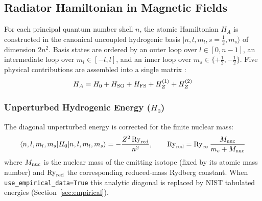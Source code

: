\documentclass[11pt,a4paper]{article}
\numberwithin{equation}{section}
\begin{document}
\subsection{Radiator Hamiltonian in Magnetic Fields}
\label{sec:radiator_H}
For each principal quantum number shell $n$, the atomic Hamiltonian $H_A$ is constructed in the canonical uncoupled hydrogenic basis $|n, l, m_l, s{=}\tfrac{1}{2}, m_s\rangle$ of dimension $2n^2$. Basis states are ordered by an outer loop over $l \in [0, n-1]$, an intermediate loop over $m_l \in [-l, l]$, and an inner loop over $m_s \in \{+\tfrac{1}{2}, -\tfrac{1}{2}\}$. Five physical contributions are assembled into a single matrix \cite{bethesalpeter}:
\begin{equation}
H_A = H_0 + H_{\rm SO} + H_{\rm FS} + H_Z^{(1)} + H_Z^{(2)}
\end{equation}

\subsubsection{\texorpdfstring{Unperturbed Hydrogenic Energy ($H_0$)}{Unperturbed Hydrogenic Energy (H0)}}
The diagonal unperturbed energy is corrected for the finite nuclear mass:
\begin{equation}
\langle n, l, m_l, m_s | H_0 | n, l, m_l, m_s \rangle = -\frac{Z^2\,\mathrm{Ry}_{\rm red}}{n^2},
\qquad
\mathrm{Ry}_{\rm red} = \mathrm{Ry}_{\infty}\,\frac{M_{\rm nuc}}{m_e + M_{\rm nuc}}
\end{equation}
where $M_{\rm nuc}$ is the nuclear mass of the emitting isotope (fixed by its atomic mass number) and $\mathrm{Ry}_{\rm red}$ the corresponding reduced-mass Rydberg constant. When \texttt{use\_empirical\_\allowbreak{}data=True} this analytic diagonal is replaced by NIST tabulated energies (Section~\ref{sec:empirical}).
\end{document}
